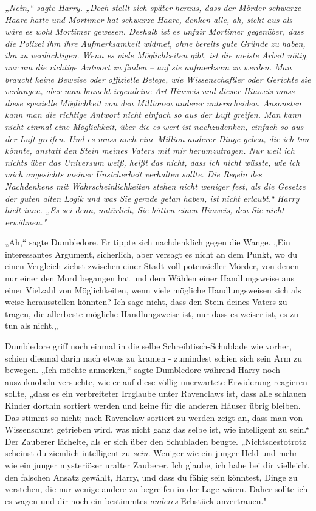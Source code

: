 {\emph{„Nein,“ sagte Harry. „Doch stellt sich später heraus, dass der Mörder schwarze Haare hatte und Mortimer hat schwarze Haare, denken alle, ah, sieht aus als wäre es wohl Mortimer gewesen. Deshalb ist es unfair Mortimer gegenüber, dass die Polizei} \emph{\emph{ihm ihre Aufmerksamkeit widmet,}} \emph{ohne bereits gute Gründe zu haben, ihn zu verdächtigen. Wenn es viele Möglichkeiten gibt, ist die meiste Arbeit nötig, nur um die richtige Antwort zu} \emph{\emph{finden}} \emph{-- auf sie aufmerksam zu werden. Man braucht keine} \emph{\emph{Beweise}} \emph{oder offizielle Belege, wie Wissenschaftler oder Gerichte sie verlangen, aber man braucht irgendeine Art} \emph{\emph{Hinweis}} \emph{und dieser Hinweis muss diese spezielle Möglichkeit von den Millionen anderer unterscheiden. Ansonsten kann man die richtige Antwort nicht einfach so aus der Luft greifen. Man kann nicht einmal eine Möglichkeit, über die es wert ist nachzudenken, einfach so aus der Luft greifen. Und es muss noch eine Million anderer Dinge geben, die ich tun könnte, anstatt den Stein meines Vaters mit mir herumzutragen. Nur weil ich nichts über das Universum weiß, heißt das nicht, dass ich nicht wüsste, wie ich mich angesichts meiner Unsicherheit verhalten sollte. Die Regeln des Nachdenkens mit Wahrscheinlichkeiten stehen nicht weniger fest, als die Gesetze der guten alten Logik und was Sie gerade getan haben, ist} \emph{\emph{nicht erlaubt.}“ Harry hielt inne. „\emph{Es sei denn,}} \emph{natürlich, Sie hätten einen} \emph{\emph{Hinweis,}} \emph{den Sie nicht erwähnen."}

„Ah,“ sagte Dumbledore. Er tippte sich nachdenklich gegen die Wange. „Ein interessantes Argument, sicherlich, aber versagt es nicht an dem Punkt, wo du einen Vergleich ziehst zwischen einer Stadt voll potenzieller Mörder, von denen nur einer den Mord begangen hat und dem Wählen einer Handlungsweise aus einer Vielzahl von Möglichkeiten, wenn viele mögliche Handlungsweisen sich als weise herausstellen könnten? Ich sage nicht, dass den Stein deines Vaters zu tragen, die allerbeste mögliche Handlungsweise ist, nur dass es weiser ist, es zu tun als nicht.„

Dumbledore griff noch einmal in die selbe Schreibtisch-Schublade wie vorher, schien diesmal darin nach etwas zu kramen - zumindest schien sich sein Arm zu bewegen. „Ich möchte anmerken,“ sagte Dumbledore während Harry noch auszuknobeln versuchte, wie er auf diese völlig unerwartete Erwiderung reagieren sollte, „dass es ein verbreiteter Irrglaube unter Ravenclaws ist, dass alle schlauen Kinder dorthin sortiert werden und keine für die anderen Häuser übrig bleiben. Das stimmt so nicht; nach Ravenclaw sortiert zu werden zeigt an, dass man von Wissensdurst getrieben wird, was nicht ganz das selbe ist, wie intelligent zu sein.“ Der Zauberer lächelte, als er sich über den Schubladen beugte. „Nichtsdestotrotz scheinst du ziemlich intelligent zu \emph{sein.} Weniger wie ein junger Held und mehr wie ein junger mysteriöser uralter Zauberer. Ich glaube, ich habe bei dir vielleicht den falschen Ansatz gewählt, Harry, und dass du fähig sein könntest, Dinge zu verstehen, die nur wenige andere zu begreifen in der Lage wären. Daher sollte ich es wagen und dir noch ein bestimmtes \emph{anderes} Erbstück anvertrauen."

}
